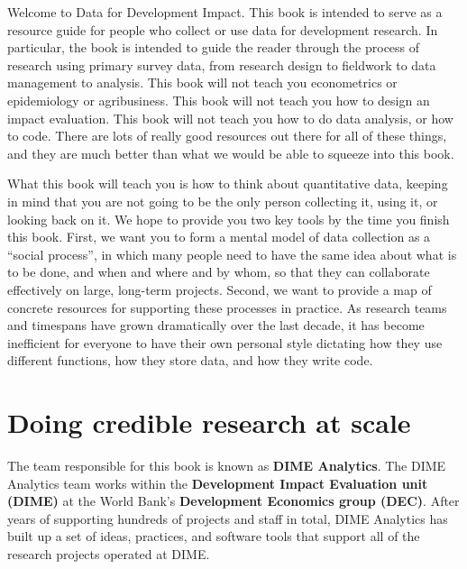 \begin{fullwidth}
Welcome to Data for Development Impact.
This book is intended to serve as a resource guide
for people who collect or use data for development research.
In particular, the book is intended to guide the reader
through the process of research using primary survey data,
from research design to fieldwork to data management to analysis.
This book will not teach you econometrics or epidemiology or agribusiness.
This book will not teach you how to design an impact evaluation.
This book will not teach you how to do data analysis, or how to code.
There are lots of really good resources out there for all of these things,
and they are much better than what we would be able to squeeze into this book.

What this book will teach you is how to think about quantitative data,
keeping in mind that you are not going to be the only person
collecting it, using it, or looking back on it.
We hope to provide you two key tools by the time you finish this book.
First, we want you to form a mental model of data collection as a ``social process'',
in which many people need to have the same idea about what is to be done, and when and where and by whom,
so that they can collaborate effectively on large, long-term projects.
Second, we want to provide a map of concrete resources for supporting these processes in practice.
As research teams and timespans have grown dramatically over the last decade,
it has become inefficient for everyone to have their own personal style
dictating how they use different functions, how they store data, and how they write code.
\end{fullwidth}


\section{Doing credible research at scale}

The team responsible for this book is known as \textbf{DIME Analytics}.
The DIME Analytics team works within the \textbf{Development Impact Evaluation unit (DIME)}
at the World Bank's \textbf{Development Economics group (DEC)}.
After years of supporting hundreds of projects and staff in total,
DIME Analytics has built up a set of ideas, practices, and software tools
that support all of the research projects operated at DIME.

